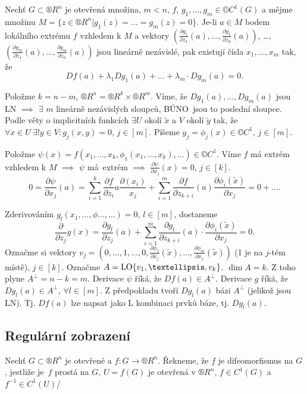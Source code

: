 \documentclass[12pt]{article}					%
\begin{document}
	\begin{veta}
		Nechť $G \subset ®R^n$ je otevřená množina, $m < n$, $f$, $g_1, …, g_m \in ©C^1(G)$ a mějme množinu $M = \{z \in ®R^n | g_1(z) = … = g_m(z) = 0\}$. Je-li $a \in M$ bodem lokálního extrému $f$ vzhledem k $M$ a vektory $(\frac{\partial g_1}{\partial z_1}(a), …, \frac{\partial g_1}{\partial z_n}(a))$, …, $(\frac{\partial g_m}{\partial z_1}(a), …, \frac{\partial g_m}{\partial z_n}(a))$ jsou lineárně nezávislé, pak existují čísla $x_1, …, x_m$ tak, že\
		$$ Df(a) + \lambda_1Dg_1(a) + … + \lambda_m·Dg_m(a) = 0. $$

		\begin{dukazin}
			Položme $k = n - m$, $®R^n = ®R^k \times ®R^m$. Víme, že $Dg_1(a), …, Dg_m(a)$ jsou LN $\implies$ $\exists$ $m$ lineárně nezávislých sloupců, BÚNO jsou to poslední sloupce. Podle věty o implicitních funkcích $\exists U$ okolí $\tilde x$ a $V$ okolí $\tilde y$ tak, že $\forall x \in U\ \exists!y \in V: g_j(x, y) = 0$, $j \in [m]$. Píšeme $y_j = \phi_j(x) \in ©C^1$, $j \in [m]$.

			Položme $\psi(x) = f(x_1, …, x_k, \phi_1(x_1, …, x_k), …) \in ©C^1$. Víme $f$ má extrém vzhledem k $M$ $\implies$ $\psi$ má extrém $\implies$ $\frac{\partial\psi}{\partial x_j}(x) = 0$, $j \in [k]$.
			$$ 0 = \frac{\partial \psi}{\partial x_j}(a) = \sum_{i=1}^k \frac{\partial f}{\partial z_i}a \frac{\partial(x_i)}{x_j} + \sum_{i=1}^m \frac{\partial f}{\partial z_{k+i}} (a) \frac{\partial \phi_i(\tilde x)}{\partial x_j} = 0 + …. $$

			Zderivováním $g_l(x_1, …, \phi…, …) = 0$, $l \in [m]$, dostaneme
			$$ \frac{\partial}{\partial z_j}g(x) = \frac{\partial g_l}{\partial z_j}(a)  + \sum_{i=1}^m \frac{\partial g_l}{\partial z_{k+i}}(a)·\frac{\partial \phi_i(\tilde x)}{\partial x_j} = 0. $$
			Označme si vektory $v_j = (0, …, 1, …, 0, \frac{\partial \phi_1}{\partial x_j}(\tilde x), …, \frac{\partial \phi_m}{\partial x_j}(\tilde x))$ (1 je na $j$-tém místě), $j \in [k]$. Označme $A = \LO\{v_1, …, v_k\}$. $\dim A = k$. Z toho plyne $A^\perp = n - k = m$. Derivace $\psi$ říká, že $Df(a) \in A^\perp$. Derivace $g$ říká, že $Dg_l(a) \in A^\perp$, $\forall l \in [m]$. Z předpokladu tvoří $Dg_l(a)$ bázi $A^\perp$ (jelikož jsou LN). Tj. $Df(a)$ lze napsat jako L kombinaci prvků báze, tj. $Dg_l(a)$.
		\end{dukazin}
	\end{veta}
	

	\subsection{Regulární zobrazení}
	\begin{definice}[Difeomorfismus]
		Nechť $G \subset ®R^n$ je otevřené a $f: G \rightarrow ®R^n$. Řekneme, že $f$ je difeomorfismus na $G$, jestliže je $f$ prostá na $G$, $U = f(G)$ je otevřená v $®R^n$, $f \in C^1(G)$ a $f^{-1} \in C^1(U)$/
	\end{definice}
\end{document}

